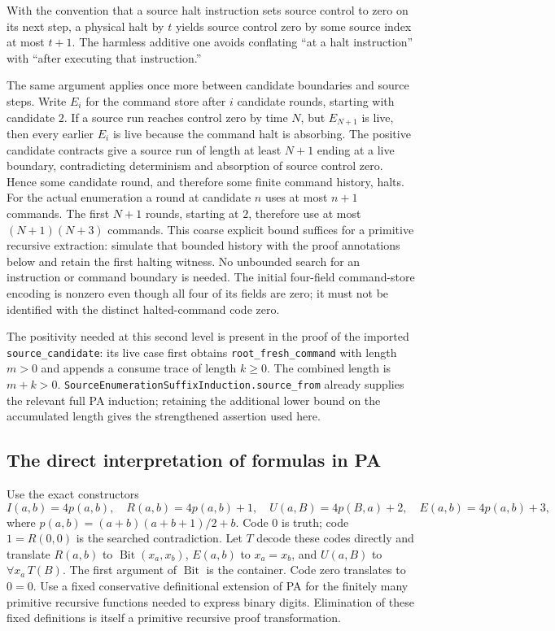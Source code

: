 With the convention that a source halt instruction sets source control
to zero on its next step, a physical halt by $t$ yields source control
zero by some source index at most $t+1$.  The harmless additive one avoids
conflating ``at a halt instruction'' with ``after executing that instruction.''

The same argument applies once more between candidate boundaries and
source steps.  Write $E_i$ for the command store after $i$ candidate rounds,
starting with candidate $2$.  If a source run reaches control zero by
time $N$, but $E_{N+1}$ is live, then every earlier $E_i$ is live because
the command halt is absorbing.  The positive candidate contracts give a
source run of length at least $N+1$ ending at a live boundary, contradicting
determinism and absorption of source control zero.  Hence some candidate
round, and therefore some finite command history, halts.
For the actual enumeration a round at candidate $n$ uses at most $n+1$
commands.  The first $N+1$ rounds, starting at $2$, therefore use at most
$(N+1)(N+3)$ commands.  This coarse explicit bound suffices for a
primitive recursive extraction: simulate that bounded history with the
proof annotations below and retain the first halting witness.  No
unbounded search for an instruction or command boundary is needed.
The initial four-field command-store encoding is nonzero even though
all four of its fields are zero; it must not be identified with the
distinct halted-command code zero.

The positivity needed at this second level is present in the proof of
the imported \texttt{source\_candidate}: its live case first obtains
\texttt{root\_fresh\_command} with length $m>0$ and appends a consume
trace of length $k\geq0$.  The combined length is $m+k>0$.
\texttt{SourceEnumerationSuffixInduction.source\_from} already supplies
the relevant full PA induction; retaining the additional lower bound
on the accumulated length gives the strengthened assertion used here.

\subsection{The direct interpretation of formulas in PA}

Use the exact constructors
\[
 I(a,b)=4p(a,b),\quad R(a,b)=4p(a,b)+1,\quad
 U(a,B)=4p(B,a)+2,\quad E(a,b)=4p(a,b)+3,
\]
where $p(a,b)=(a+b)(a+b+1)/2+b$.  Code $0$ is truth; code $1=R(0,0)$
is the searched contradiction.  Let $T$ decode these codes directly and
translate $R(a,b)$ to $\operatorname{Bit}(x_a,x_b)$, $E(a,b)$ to
$x_a=x_b$, and $U(a,B)$ to $\forall x_a\,T(B)$.  The first argument
of $\operatorname{Bit}$ is the container.  Code zero translates to $0=0$.
Use a fixed conservative definitional extension of PA for the finitely
many primitive recursive functions needed to express binary digits.
Elimination of these fixed definitions is itself a primitive recursive
proof transformation.

